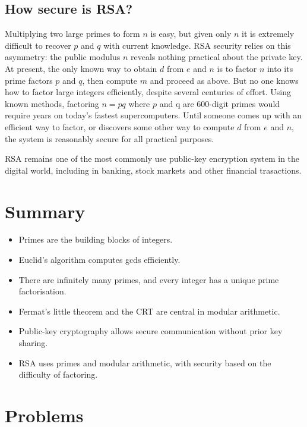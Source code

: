 \subsection{How secure is RSA?}

Multiplying two large primes to form $n$ is easy, but given only $n$ it is extremely difficult to recover $p$ and $q$ with current knowledge.  
RSA security relies on this asymmetry: the public modulus $n$ reveals nothing practical about the private key.  
At present, the only known way to obtain $d$ from $e$ and $n$ is to factor $n$ into its prime factors $p$ and $q$, then compute $m$ and proceed as
above. But no one knows how to factor large integers efficiently, despite several centuries of effort. Using known methods, factoring $n = pq$ where $p$
and q are 600-digit primes would require years on today's fastest supercomputers. Until someone comes up with an efficient way to factor, or discovers some
other way to compute $d$ from $e$ and $n$, the system is reasonably secure for all practical purposes.

RSA remains one of the most commonly use public-key encryption system in the digital world, including in banking, stock markets and other financial trasactions.


\section*{Summary}
\begin{itemize}
\item Primes are the building blocks of integers.
\item Euclid’s algorithm computes gcds efficiently.
\item There are infinitely many primes, and every integer has a unique prime factorisation.
\item Fermat’s little theorem and the CRT are central in modular arithmetic.
\item Public-key cryptography allows secure communication without prior key sharing.
\item RSA uses primes and modular arithmetic, with security based on the difficulty of factoring.
\end{itemize}

\section*{Problems}

